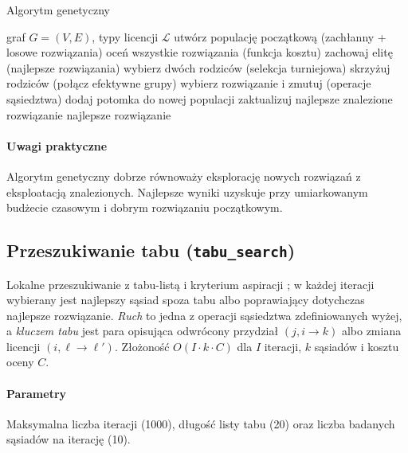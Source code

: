 \begin{algorithm}[H]
\caption{Algorytm genetyczny}
\label{alg:ga}
\begin{algorithmic}[1]
\Require graf $G=(V,E)$, typy licencji $\mathcal{L}$
\State utwórz populację początkową (zachłanny + losowe rozwiązania)
  \State oceń wszystkie rozwiązania (funkcja kosztu)
  \State zachowaj elitę (najlepsze rozwiązania)
      \State wybierz dwóch rodziców (selekcja turniejowa)
      \State skrzyżuj rodziców (połącz efektywne grupy)
    \Else
      \State wybierz rozwiązanie i zmutuj (operacje sąsiedztwa)
    \EndIf
    \State dodaj potomka do nowej populacji
  \EndWhile
  \State zaktualizuj najlepsze znalezione rozwiązanie
\EndFor
\State \Return najlepsze rozwiązanie
\end{algorithmic}
\end{algorithm}

\paragraph{Uwagi praktyczne}
Algorytm genetyczny dobrze równoważy eksplorację nowych rozwiązań z eksploatacją znalezionych. Najlepsze wyniki uzyskuje przy umiarkowanym budżecie czasowym i dobrym rozwiązaniu początkowym.

\subsection{Przeszukiwanie tabu (\texttt{tabu\_search})}\label{subsec:tabu}
Lokalne przeszukiwanie z tabu-listą i kryterium aspiracji \cite{glover1989}; w każdej iteracji wybierany jest najlepszy sąsiad spoza tabu albo poprawiający dotychczas najlepsze rozwiązanie. \emph{Ruch} to jedna z operacji sąsiedztwa zdefiniowanych wyżej, a \emph{kluczem tabu} jest para opisująca odwrócony przydział $(j, i\to k)$ albo zmiana licencji $(i,\ell\to\ell')$. Złożoność $O(I\cdot k\cdot C)$ dla \(I\) iteracji, \(k\) sąsiadów i kosztu oceny \(C\).

\paragraph{Parametry}
Maksymalna liczba iteracji (1000), długość listy tabu (20) oraz liczba badanych sąsiadów na iterację (10).

